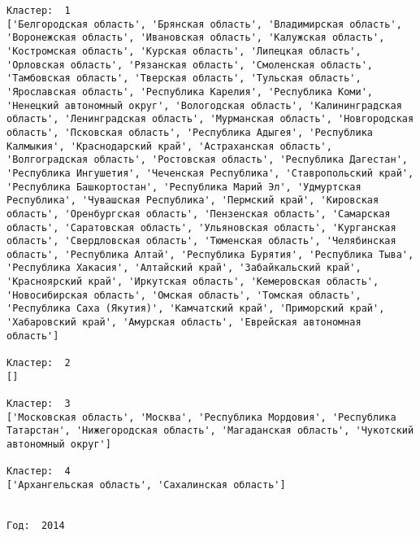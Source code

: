 \documentclass[11pt]{article}
\begin{document}
\begin{Verbatim}[commandchars=\\\{\}]
Кластер:  1
['Белгородская область', 'Брянская область', 'Владимирская область', 'Воронежская область', 'Ивановская область', 'Калужская область', 'Костромская область', 'Курская область', 'Липецкая область', 'Орловская область', 'Рязанская область', 'Смоленская область', 'Тамбовская область', 'Тверская область', 'Тульская область', 'Ярославская область', 'Республика Карелия', 'Республика Коми', 'Ненецкий автономный округ', 'Вологодская область', 'Калинингpадская область', 'Ленинградская область', 'Мурманская область', 'Новгородская область', 'Псковская область', 'Республика Адыгея', 'Республика Калмыкия', 'Краснодарский край', 'Астраханская область', 'Волгоградская область', 'Ростовская область', 'Республика Дагестан', 'Республика Ингушетия', 'Чеченская Республика', 'Ставропольский край', 'Республика Башкортостан', 'Республика Марий Эл', 'Удмуртская Республика', 'Чувашская Республика', 'Пермский край', 'Кировская область', 'Оренбургская область', 'Пензенская область', 'Самарская область', 'Саратовская область', 'Ульяновская область', 'Курганская область', 'Свердловская область', 'Тюменская область', 'Челябинская область', 'Республика Алтай', 'Республика Бурятия', 'Республика Тыва', 'Республика Хакасия', 'Алтайский край', 'Забайкальский край', 'Красноярский край', 'Иркутская область', 'Кемеровская область', 'Новосибирская область', 'Омская область', 'Томская область', 'Республика Саха (Якутия)', 'Камчатский край', 'Приморский край', 'Хабаровский край', 'Амурская область', 'Еврейская автономная область']

Кластер:  2
[]

Кластер:  3
['Московская область', 'Москва', 'Республика Мордовия', 'Республика Татарстан', 'Нижегородская область', 'Магаданская область', 'Чукотский автономный округ']

Кластер:  4
['Архангельская область', 'Сахалинская область']


Год:  2014


\end{Verbatim}
\end{document}
